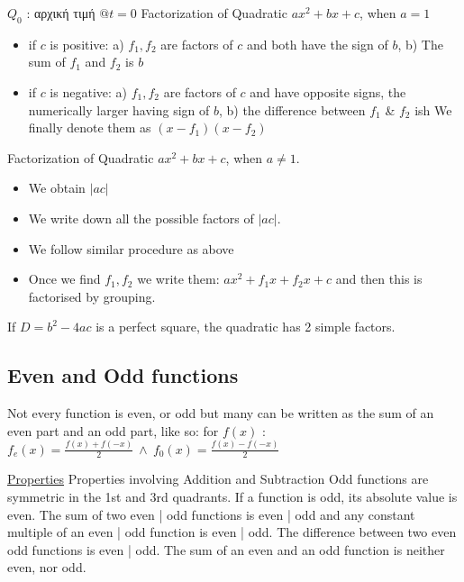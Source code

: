 \documentclass[12pt]{article}
\begin{document}
\begin{flushleft}
	$Q_0$  :  \textgreek{αρχική τιμή} $@ t=0$ \linebreak 
	\textbullet \quad Factorization of Quadratic $ax^2 +bx +c$, when $a=1$  
	\begin{itemize}
		\renewcommand{\labelitemi}{$\rightarrow$}
	\item if $c$ is positive: a) $f_1, f_2$ are factors of $c$ and both have the sign of $b$, 
									   b) The sum of $f_1$ and $f_2$ is $b$
	\item if $c$ is negative: a) $f_1, f_2$ are factors of $c$ and have opposite signs, the numerically larger having sign of $b$, 
										b) the difference between $f_1$ \& $f_2$ ish  
	We finally denote them as $\displaystyle (x-f_1)(x-f_2)$ 
	\end{itemize}
	
	\textbullet \quad Factorization of Quadratic $ax^2 + bx +c$, when $a\neq 1$. 
	\begin{itemize}
		\renewcommand{\labelitemi}{$\rightarrow$}
	\item We obtain $|ac|$
	\item We write down all the possible factors of $|ac|$. 
	\item We follow similar procedure as above 
	\item Once we find $f_1, f_2$ we write them: $\displaystyle ax^2 +f_1 x+ f_2 x + c$ and then this is factorised by grouping.
	\end{itemize}
	\textbullet \quad If $\displaystyle D=b^2 -4ac$ is a perfect square, the quadratic has 2 simple factors. \linebreak 
	
	\subsection{Even and Odd functions} 
	
	\textbullet \quad Not every function is even, or odd but many can be written as the sum of an even part and an odd part, like so: \linebreak 
	for $f(x)$  :  $\displaystyle f_e(x) = \frac{f(x) + f(-x)}{2} \ \land \ f_0(x) = \frac{f(x) - f(-x)}{2} $ \linebreak 	
	
	\uline{Properties} \linebreak 
	Properties involving Addition and Subtraction \linebreak 
	\textbullet \quad Odd functions are symmetric in the 1st and 3rd quadrants. \linebreak 
	\textbullet \quad If a function is odd, its absolute value is even. \linebreak 
	\textbullet \quad The sum of two even | odd functions is even | odd and any constant multiple of an even | odd function is even | odd. \linebreak 
	\textbullet \quad The difference between two even  odd functions is even | odd. \linebreak 
	\textbullet \quad The sum of an even and an odd function is neither even, nor odd. \linebreak 
	

\end{flushleft}
\end{document}
